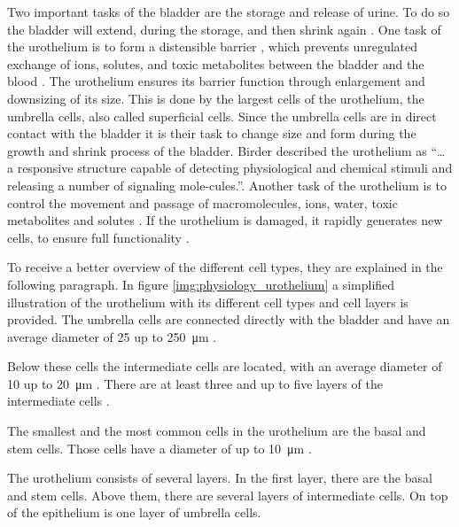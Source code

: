 Two important tasks of the bladder are the storage and release of urine. To do so the bladder will extend, during the storage, and then shrink again \cite{Karl-ErikAndersson2004}. One task of the urothelium is to form a distensible barrier \cite{Apodaca2004, Lazzeri2006, PuneetKhandelwal2009, Lewis2000, WRCross2005}, which prevents unregulated exchange of ions, solutes, and toxic metabolites between the bladder and the blood \cite{Apodaca2004, Lazzeri2006, PuneetKhandelwal2009, Lewis2000}. The urothelium ensures its barrier function through enlargement and downsizing of its size. This is done by the largest cells of the urothelium, the umbrella cells, also called superficial cells. Since the umbrella cells are in direct contact with the bladder it is their task to change size and form during the growth and shrink process of the bladder. Birder \cite{Birder2005} described the urothelium as “… a responsive structure capable of detecting physiological and chemical stimuli and releasing a number of signaling mole-cules.”. Another task of the urothelium is to control the movement and passage of macromolecules, ions, water, toxic metabolites and solutes \cite{Apodaca2004, PuneetKhandelwal2009}. If the urothelium is damaged, it rapidly generates new cells, to ensure full functionality \cite{Apodaca2004, Yamany2014, PuneetKhandelwal2009}.

To receive a better overview of the different cell types, they are explained in the following paragraph. In figure \ref{img:physiology_urothelium} a simplified illustration of the urothelium with its different cell types and cell layers is provided. \newline
The umbrella cells are connected directly with the bladder and have an average diameter of 25 up to \SI{250}{\micro\metre} \cite{Yamany2014, PuneetKhandelwal2009}. 

Below these cells the intermediate cells are located, with an average diameter of 10 up to \SI{20}{\micro\metre} \cite{Yamany2014, PuneetKhandelwal2009}. There are at least three and up to five layers of the intermediate cells \cite{PuneetKhandelwal2009}. 

The smallest and the most common cells in the urothelium are the basal and stem cells. Those cells have a diameter of up to \SI{10}{\micro\metre} \cite{Lazzeri2006, PuneetKhandelwal2009}. 

The urothelium consists of several layers. In the first layer, there are the basal and stem cells. Above them, there are several layers of intermediate cells. On top of the epithelium is one layer of umbrella cells.


